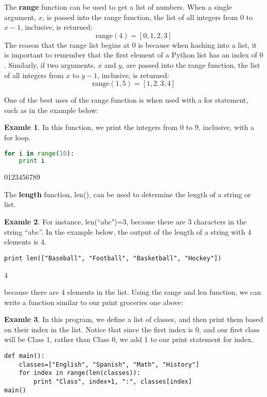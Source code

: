 \documentclass[12pt,openany]{book} %
\theoremstyle{definition}
\newtheorem{soln}{\textbf{Exam\smash{p}le} \nolinebreak }[section]
\newcounter{code}[section]
\begin{document}
The \textbf{range} function can be used to get a list of numbers.  When a single argument, $x$, is passed into the range function, the list of all integers from $0$ to $x-1$, inclusive, is returned: $$\text{range}(4)=[0,1,2,3]$$  The reason that the range list begins at $0$ is because when hashing into a list, it is important to remember that the first element of a Python list has an index of $0$.  Similarly, if two arguments, $x$ and $y$, are passed into the range function, the list of all integers from $x$ to $y-1$, inclusive, is returned: $$\text{range}(1,5)=[1,2,3,4]$$

One of the best uses of the range function is when used with a for statement, such as in the example below: 
\begin{soln}  In this function, we print the integers from $0$ to $9$, inclusive, with a for loop.  \end{soln}  
\begin{code}{}{}\begin{lstlisting}[language=Python]
for i in range(10):
    print i 
\end{lstlisting} \end{code}
\begin{out}{}{} 0123456789 \end{out} 
The \textbf{length} function, len(), can be used to determine the length of a string or list.  
\begin{soln}  For instance, len(``abc")=3, because there are $3$ characters in the string ``abc''. In the example below, the output of the length of a string with 4 elements is 4.    \end{soln}  
\begin{code}{}{}
\begin{lstlisting} 
print len(["Baseball", "Football", "Basketball", "Hockey"])
\end{lstlisting} \end{code}
\begin{out}{}{}4\end{out}
because there are $4$ elements in the list.  Using the range and len function, we can write a function similar to our print groceries one above:
\begin{soln}
In this program, we define a list of classes, and then print them based on their index in the list.  Notice that since the first index is $0$, and our first class will be Class 1, rather than Class 0, we add 1 to our print statement for index. \end{soln}  
\begin{code}{}{} \begin{lstlisting} 
def main():
	classes=["English", "Spanish", "Math", "History"]
	for index in range(len(classes)):
		print "Class", index+1, ":", classes[index]
main()
\end{lstlisting} \end{code} 
\end{document}
